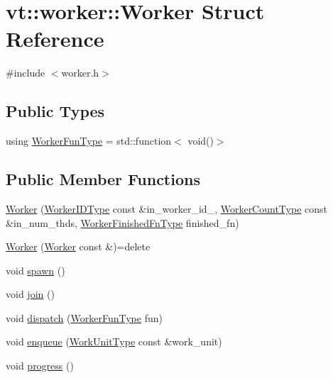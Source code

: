 \hypertarget{structvt_1_1worker_1_1_worker}{}\section{vt\+:\+:worker\+:\+:Worker Struct Reference}
\label{structvt_1_1worker_1_1_worker}


{\ttfamily \#include $<$worker.\+h$>$}

\subsection*{Public Types}
\begin{DoxyCompactItemize}
\item 
using \hyperlink{structvt_1_1worker_1_1_worker_a644fce67088c46d1e9e3d1e214d2e632}{Worker\+Fun\+Type} = std\+::function$<$ void()$>$
\end{DoxyCompactItemize}
\subsection*{Public Member Functions}
\begin{DoxyCompactItemize}
\item 
\hyperlink{structvt_1_1worker_1_1_worker_abcf7d80b7c04de054f178a48b9e8f290}{Worker} (\hyperlink{namespacevt_a656e362091da17b9b93d0655b36e3392}{Worker\+I\+D\+Type} const \&in\+\_\+worker\+\_\+id\+\_\+, \hyperlink{namespacevt_aa93398ea48f2cb6c188512250f7cc248}{Worker\+Count\+Type} const \&in\+\_\+num\+\_\+thds, \hyperlink{namespacevt_1_1worker_ae32a174a5348d27aafe73c2debea1a94}{Worker\+Finished\+Fn\+Type} finished\+\_\+fn)
\item 
\hyperlink{structvt_1_1worker_1_1_worker_a3c1945e6d1776c6ba065a4dc466904f7}{Worker} (\hyperlink{structvt_1_1worker_1_1_worker}{Worker} const \&)=delete
\item 
void \hyperlink{structvt_1_1worker_1_1_worker_a2ecfde6febbcc08c1db88bd9936ff422}{spawn} ()
\item 
void \hyperlink{structvt_1_1worker_1_1_worker_a26dfbb69a30b68c576d8836a776e54ca}{join} ()
\item 
void \hyperlink{structvt_1_1worker_1_1_worker_ac380d64d45f7fa0eb0d97914ed02ffe3}{dispatch} (\hyperlink{structvt_1_1worker_1_1_worker_a644fce67088c46d1e9e3d1e214d2e632}{Worker\+Fun\+Type} fun)
\item 
void \hyperlink{structvt_1_1worker_1_1_worker_a9621953208f1836a95b1f29b0fc7d3b6}{enqueue} (\hyperlink{namespacevt_1_1worker_a59d2fcdafa81fc0af7f921a258e42202}{Work\+Unit\+Type} const \&work\+\_\+unit)
\item 
void \hyperlink{structvt_1_1worker_1_1_worker_a4bdb22aeadc41108fd9373763f34fc1a}{progress} ()
\end{DoxyCompactItemize}


